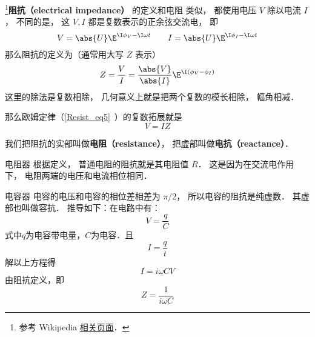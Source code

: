 
\begin{issues}
\issueDraft
\end{issues}


\footnote{参考 Wikipedia \href{https://en.wikipedia.org/wiki/Electrical_impedance}{相关页面}．}\textbf{阻抗（electrical impedance）} 的定义和电阻 类似， 都使用电压 $V$ 除以电流 $I$， 不同的是， 这 $V, I$ 都是复数表示的正余弦交流电， 即
\begin{equation}
V = \abs{U} \E^{\I \phi_V - \I \omega t}
\qquad
I = \abs{U} \E^{\I \phi_I - \I \omega t}
\end{equation}
那么阻抗的定义为（通常用大写 $Z$ 表示）
\begin{equation}
Z = \frac{V}{I} = \frac{\abs{V}}{\abs{I}} \E^{\I (\phi_V - \phi_I)}
\end{equation}
这里的除法是复数相除， 几何意义上就是把两个复数的模长相除， 幅角相减．

那么欧姆定律（\autoref{Resist_eq5}~）的复数拓展就是
\begin{equation}
V = IZ
\end{equation}

我们把阻抗的实部叫做\textbf{电阻（resistance）}， 把虚部叫做\textbf{电抗（reactance）}．

\begin{example}{电阻器}\label{impeda_ex1}
根据定义， 普通电阻的阻抗就是其电阻值 $R$． 这是因为在交流电作用下， 电阻两端的电压和电流相位相同．
\end{example}

\begin{example}{电容器}
电容的电压和电容的相位差相差为 $\pi/2$， 所以电容的阻抗是纯虚数． 其虚部也叫做容抗．
推导如下：在电路中有：
\begin{equation}
V=\frac{q}{C}
\end{equation}
式中$q$为电容带电量，$C$为电容．且
\begin{equation}
I=\frac{q}{t}
\end{equation}
解以上方程得
\begin{equation}
I=i\omega CV
\end{equation}
由阻抗定义，即
\begin{equation}
Z=\frac{1}{i\omega C}
\end{equation}

\end{example}

